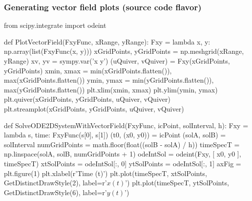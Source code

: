 \documentclass[usenames,svgnames,dvipsnames,10pt]{beamer}
\begin{document}
\begin{frame}[fragile]
\frametitle{Generating vector field plots (source code flavor)}

\begin{center}
\begin{pythoncodesmall}
from scipy.integrate import odeint

def PlotVectorField(FxyFunc, xRange, yRange):
    Fxy = lambda x, y: np.array(list(FxyFunc(x, y)))
    xGridPoints, yGridPoints = np.meshgrid(xRange, yRange)
    xv, yv = sympy.var('x y')
    (uQuiver, vQuiver) = Fxy(xGridPoints, yGridPoints)
    xmin, xmax = min(xGridPoints.flatten()), max(xGridPoints.flatten())
    ymin, ymax = min(yGridPoints.flatten()), max(yGridPoints.flatten())
    plt.xlim(xmin, xmax)
    plt.ylim(ymin, ymax)
    plt.quiver(xGridPoints, yGridPoints, uQuiver, vQuiver)
    plt.streamplot(xGridPoints, yGridPoints, uQuiver, vQuiver)

def SolveODE2DSystemWithVectorField(FxyFunc, icPoint, solInterval, h):
    Fxy = lambda s, time: FxyFunc(s[0], s[1])
    (t0, (x0, y0)) = icPoint
    (solA, solB) = solInterval
    numGridPoints = math.floor(float((solB - solA) / h))
    timeSpecT = np.linspace(solA, solB, numGridPoints + 1)
    odeIntSol = odeint(Fxy, [ x0, y0 ], timeSpecT)
    xtSolPoints = odeIntSol[:, 0] 
    ytSolPoints = odeIntSol[:, 1]
    axFig = plt.figure(1) 
    plt.xlabel(r'Time (t)')
    plt.plot(timeSpecT, xtSolPoints, GetDistinctDrawStyle(2), label=r'$x(t)$')
    plt.plot(timeSpecT, ytSolPoints, GetDistinctDrawStyle(6), label=r'$y(t)$')
\end{pythoncodesmall}
\end{center}

\end{frame}
\end{document}
